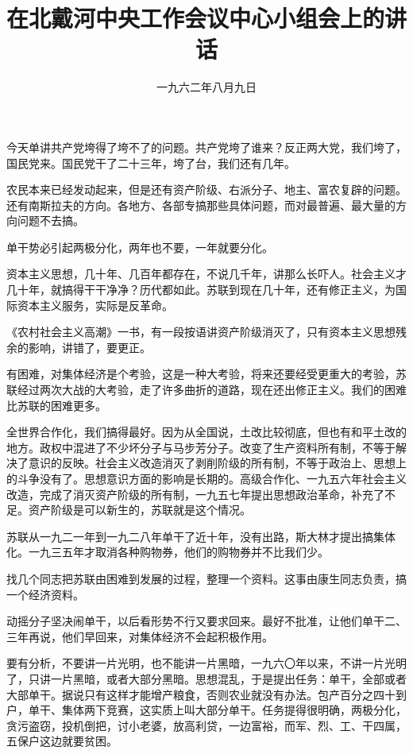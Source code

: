 
\title{在北戴河中央工作会议中心小组会上的讲话}
\date{一九六二年八月九日}
\maketitle


今天单讲共产党垮得了垮不了的问题。共产党垮了谁来？反正两大党，我们垮了，国民党来。国民党干了二十三年，垮了台，我们还有几年。

农民本来已经发动起来，但是还有资产阶级、右派分子、地主、富农复辟的问题。还有南斯拉夫的方向。各地方、各部专搞那些具体问题，而对最普遍、最大量的方向问题不去搞。

单干势必引起两极分化，两年也不要，一年就要分化。

资本主义思想，几十年、几百年都存在，不说几千年，讲那么长吓人。社会主义才几十年，就搞得干干净净？历代都如此。苏联到现在几十年，还有修正主义，为国际资本主义服务，实际是反革命。

《农村社会主义高潮》一书，有一段按语讲资产阶级消灭了，只有资本主义思想残余的影响，讲错了，要更正。

有困难，对集体经济是个考验，这是一种大考验，将来还要经受更重大的考验，苏联经过两次大战的大考验，走了许多曲折的道路，现在还出修正主义。我们的困难比苏联的困难更多。

全世界合作化，我们搞得最好。因为从全国说，土改比较彻底，但也有和平土改的地方。政权中混进了不少坏分子与马步芳分子。改变了生产资料所有制，不等于解决了意识的反映。社会主义改造消灭了剥削阶级的所有制，不等于政治上、思想上的斗争没有了。思想意识方面的影响是长期的。高级合作化、一九五六年社会主义改造，完成了消灭资产阶级的所有制，一九五七年提出思想政治革命，补充了不足。资产阶级是可以新生的，苏联就是这个情况。

苏联从一九二一年到一九二八年单干了近十年，没有出路，斯大林才提出搞集体化。一九三五年才取消各种购物券，他们的购物券并不比我们少。

找几个同志把苏联由困难到发展的过程，整理一个资料。这事由康生同志负责，搞一个经济资料。

动摇分子坚决闹单干，以后看形势不行又要求回来。最好不批准，让他们单干二、三年再说，他们早回来，对集体经济不会起积极作用。

要有分析，不要讲一片光明，也不能讲一片黑暗，一九六〇年以来，不讲一片光明了，只讲一片黑暗，或者大部分黑暗。思想混乱，于是提出任务：单干，全部或者大部单干。据说只有这样才能增产粮食，否则农业就没有办法。包产百分之四十到户，单干、集体两下竞赛，这实质上叫大部分单干。任务提得很明确，两极分化，贪污盗窃，投机倒把，讨小老婆，放高利贷，一边富裕，而军、烈、工、干四属，五保户这边就要贫困。

